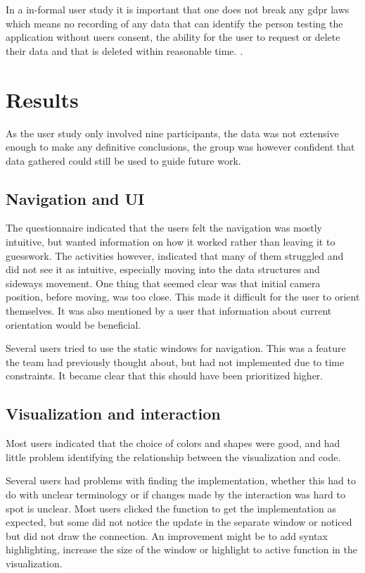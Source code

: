 In a in-formal user study it is important that one does not break any \gls{gdpr} laws which means no recording of any data that can identify the person testing the application without users consent, the ability for the user to request or delete their data and that is deleted within reasonable time. \cite{lovdata:gdpr}. 

\section{Results}
As the user study only involved nine participants, the data was not extensive enough to make any definitive conclusions, the group was however confident that data gathered could still be used to guide future work. 

\subsection{Navigation and UI}
The questionnaire indicated that the users felt the navigation was mostly intuitive, but wanted information on how it worked rather than leaving it to guesswork. The activities however, indicated that many of them struggled and did not see it as intuitive, especially moving into the data structures and sideways movement. One thing that seemed clear was that initial camera position, before moving, was too close. This made it difficult for the user to orient themselves. It was also mentioned by a user that information about current orientation would be beneficial.

Several users tried to use the static windows for navigation. This was a feature the team had previously thought about, but had not implemented due to time constraints. It became clear that this should have been prioritized higher.

\subsection{Visualization and interaction}
Most users indicated that the choice of colors and shapes were good, and had little problem identifying the relationship between the visualization and code. 

Several users had problems with finding the implementation, whether this had to do with unclear terminology or if changes made by the interaction was hard to spot is unclear. Most users clicked the function to get the implementation as expected, but some did not notice the update in the separate window or noticed but did not draw the connection. An improvement might be to add syntax highlighting, increase the size of the window or highlight to active function in the visualization.

